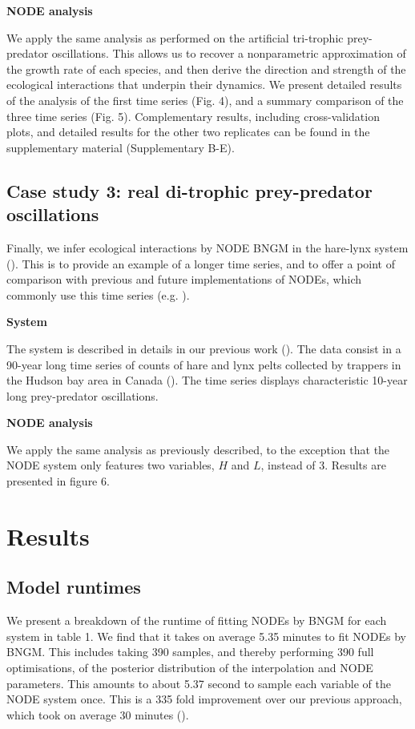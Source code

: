 \documentclass[11pt, oneside]{article}
\begin{document}
\textbf{NODE analysis}

We apply the same analysis as performed on the artificial tri-trophic prey-predator oscillations.
This allows us to recover a nonparametric approximation of the growth rate of each species, and then derive the direction and strength of the ecological interactions that underpin their dynamics.
We present detailed results of the analysis of the first time series (Fig. 4), and a summary comparison of the three time series (Fig. 5).
Complementary results, including cross-validation plots, and detailed results for the other two replicates can be found in the supplementary material (Supplementary B-E).

\subsection{Case study 3: real di-trophic prey-predator oscillations}

Finally, we infer ecological interactions by NODE BNGM in the hare-lynx system (\cite{Odum1972}).
This is to provide an example of a longer time series, and to offer a point of comparison with previous and future implementations of NODEs, which commonly use this time series (e.g. \cite{Bonnaffe2021a,Frank2022}).

\textbf{System}

The system is described in details in our previous work (\cite{Bonnaffe2021a}).
The data consist in a 90-year long time series of counts of hare and lynx pelts collected by trappers in the Hudson bay area in Canada (\cite{Odum1972}).
The time series displays characteristic 10-year long prey-predator oscillations.

\textbf{NODE analysis}

We apply the same analysis as previously described, to the exception that the NODE system only features two variables, $H$ and $L$, instead of 3.
Results are presented in figure 6.

\section{Results}

\subsection{Model runtimes}

We present a breakdown of the runtime of fitting NODEs by BNGM for each system in table 1.
We find that it takes on average 5.35 minutes to fit NODEs by BNGM.
This includes taking 390 samples, and thereby performing 390 full optimisations, of the posterior distribution of the interpolation and NODE parameters. 
This amounts to about 5.37 second to sample each variable of the NODE system once.
This is a 335 fold improvement over our previous approach, which took on average 30 minutes (\cite{Bonnaffe2021a}).
\end{document}
